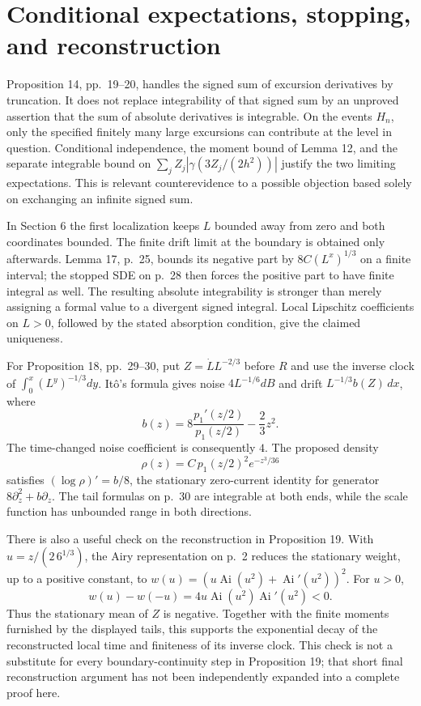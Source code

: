 \documentclass[10pt]{article}
\begin{document}
\section*{Conditional expectations, stopping, and reconstruction}
Proposition 14, pp. 19–20, handles the signed sum of excursion derivatives by truncation. It does not replace integrability of that signed sum by an unproved assertion that the sum of absolute derivatives is integrable. On the events \(H_n\), only the specified finitely many large excursions can contribute at the level in question. Conditional independence, the moment bound of Lemma 12, and the separate integrable bound on \(\sum_j Z_j|\gamma(3Z_j/(2h^2))|\) justify the two limiting expectations. This is relevant counterevidence to a possible objection based solely on exchanging an infinite signed sum.\par
In Section 6 the first localization keeps \(L\) bounded away from zero and both coordinates bounded. The finite drift limit at the boundary is obtained only afterwards. Lemma 17, p. 25, bounds its negative part by \(8C(L^x)^{1/3}\) on a finite interval; the stopped SDE on p. 28 then forces the positive part to have finite integral as well. The resulting absolute integrability is stronger than merely assigning a formal value to a divergent signed integral. Local Lipschitz coefficients on \(L>0\), followed by the stated absorption condition, give the claimed uniqueness.\par
For Proposition 18, pp. 29–30, put \(Z=\dot L L^{-2/3}\) before \(R\) and use the inverse clock of \(\int_0^x(L^y)^{-1/3}dy\). Itô’s formula gives noise \(4L^{-1/6}dB\) and drift \(L^{-1/3}b(Z)\,dx\), where \[b(z)=8\frac{p_1'(z/2)}{p_1(z/2)}-\frac23z^2.\] The time-changed noise coefficient is consequently \(4\). The proposed density \[\rho(z)=C\,p_1(z/2)^2 e^{-z^3/36}\] satisfies \((\log\rho)'=b/8\), the stationary zero-current identity for generator \(8\partial_z^2+b\partial_z\). The tail formulas on p. 30 are integrable at both ends, while the scale function has unbounded range in both directions.\par
There is also a useful check on the reconstruction in Proposition 19. With \(u=z/(2\,6^{1/3})\), the Airy representation on p. 2 reduces the stationary weight, up to a positive constant, to \(w(u)=(u\operatorname{Ai}(u^2)+\operatorname{Ai}'(u^2))^2\). For \(u>0\), \[w(u)-w(-u)=4u\operatorname{Ai}(u^2)\operatorname{Ai}'(u^2)<0 .\] Thus the stationary mean of \(Z\) is negative. Together with the finite moments furnished by the displayed tails, this supports the exponential decay of the reconstructed local time and finiteness of its inverse clock. This check is not a substitute for every boundary-continuity step in Proposition 19; that short final reconstruction argument has not been independently expanded into a complete proof here.\par
\end{document}
